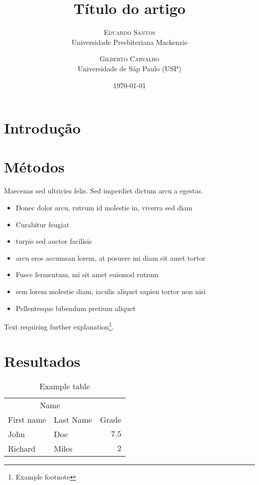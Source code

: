 \documentclass[twoside,twocolumn]{article}
\title{Título do artigo}
\author{%
\textsc{Eduardo Santos}\\ %
\normalsize Universidade Presbiteriana Mackenzie \\ %
\and
\textsc{Gilberto Carvalho}\\%
\normalsize Universidade de Sãp Paulo (USP) \\ %
}
\date{\today} %
\begin{document}
\maketitle

\section{Introdução}

\blindtext

\blindtext


\section{Métodos}

Maecenas sed ultricies felis. Sed imperdiet dictum arcu a egestas. 
\begin{itemize}
\item Donec dolor arcu, rutrum id molestie in, viverra sed diam
\item Curabitur feugiat
\item turpis sed auctor facilisis
\item arcu eros accumsan lorem, at posuere mi diam sit amet tortor
\item Fusce fermentum, mi sit amet euismod rutrum
\item sem lorem molestie diam, iaculis aliquet sapien tortor non nisi
\item Pellentesque bibendum pretium aliquet
\end{itemize}
\blindtext

Text requiring further explanation\footnote{Example footnote}.


\section{Resultados}

\begin{table}
\caption{Example table}
\centering
\begin{tabular}{llr}
\toprule
\multicolumn{2}{c}{Name} \\
\cmidrule(r){1-2}
First name & Last Name & Grade \\
\midrule
John & Doe & $7.5$ \\
Richard & Miles & $2$ \\
\bottomrule
\end{tabular}
\end{table}
\end{document}
